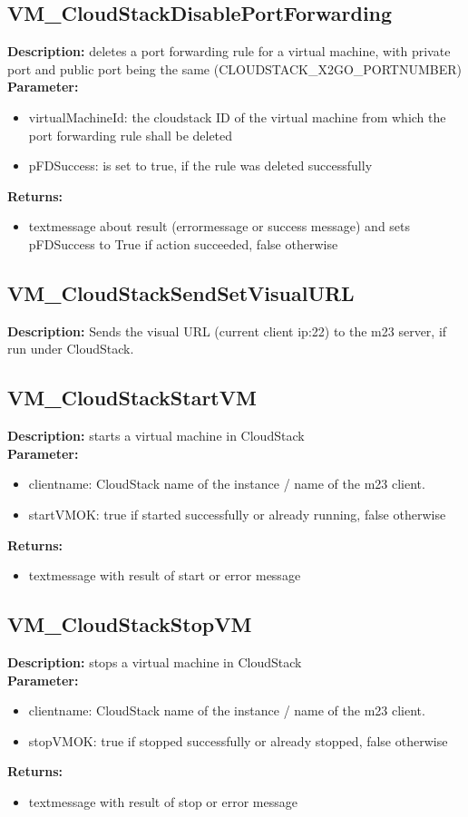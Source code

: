 \subsection{VM\_CloudStackDisablePortForwarding}
\textbf{Description:} deletes a port forwarding rule for a virtual machine, with private port and public port being the same (CLOUDSTACK\_X2GO\_PORTNUMBER)\\
\textbf{Parameter:}
\begin{itemize}
\item virtualMachineId: the cloudstack ID of the virtual machine from which the port forwarding rule shall be deleted
\item pFDSuccess: is set to true, if the rule was deleted successfully
\end{itemize}
\textbf{Returns:}
\begin{itemize}
\item textmessage about result (errormessage or success message) and sets pFDSuccess to True if action succeeded, false otherwise
\end{itemize}

\subsection{VM\_CloudStackSendSetVisualURL}
\textbf{Description:} Sends the visual URL (current client ip:22) to the m23 server, if run under CloudStack.\\

\subsection{VM\_CloudStackStartVM}
\textbf{Description:} starts a virtual machine in CloudStack\\
\textbf{Parameter:}
\begin{itemize}
\item clientname: CloudStack name of the instance / name of the m23 client.
\item startVMOK: true if started successfully or already running, false otherwise
\end{itemize}
\textbf{Returns:}
\begin{itemize}
\item textmessage with result of start or error message
\end{itemize}

\subsection{VM\_CloudStackStopVM}
\textbf{Description:} stops a virtual machine in CloudStack\\
\textbf{Parameter:}
\begin{itemize}
\item clientname: CloudStack name of the instance / name of the m23 client.
\item stopVMOK: true if stopped successfully or already stopped, false otherwise
\end{itemize}
\textbf{Returns:}
\begin{itemize}
\item textmessage with result of stop or error message
\end{itemize}


